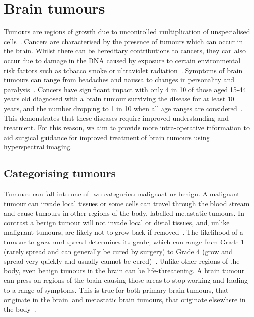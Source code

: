 \section{Brain tumours}\label{sec:braintumours}
Tumours are regions of growth due to uncontrolled multiplication of unspecialised cells~\citep{WorldHealthOrganisation2023}. Cancers are characterised by the presence of tumours which can occur in the brain. Whilst there can be hereditary contributions to cancers, they can also occur due to damage in the DNA caused by exposure to certain environmental risk factors such as tobacco smoke or ultraviolet radiation~\citep{WorldHealthOrganisation2023}. 
Symptoms of brain tumours can range from headaches and nausea to changes in personality and paralysis~\citep{NationalHealthService2023}. 
Cancers have significant impact with only 4 in 10 of those aged 15-44 years old diagnosed with a brain tumour surviving the disease for at least 10 years, and the number dropping to 1 in 10 when all age ranges are considered~\citep{CancerResearchUK2023}. This demonstrates that these diseases require improved understanding and treatment. For this reason, we aim to provide more intra-operative information to aid surgical guidance for improved treatment of brain tumours using hyperspectral imaging. 

\subsection{Categorising tumours} 
Tumours can fall into one of two categories: malignant or benign. A malignant tumour can invade local tissues or some cells can travel through the blood stream and cause tumours in other regions of the body, labelled metastatic tumours. In contrast a benign tumour will not invade local or distal tissues, and, unlike malignant tumours, are likely not to grow back if removed~\citep{Institute2021}. The likelihood of a tumour to grow and spread determines its grade, which can range from Grade 1 (rarely spread and can generally be cured by surgery) to Grade 4 (grow and spread very quickly and usually cannot be cured)~\citep{Institute2023}. Unlike other regions of the body, even benign tumours in the brain can be life-threatening. A brain tumour can press on regions of the brain causing those areas to stop working and leading to a range of symptoms. This is true for both primary brain tumours, that originate in the brain, and metastatic brain tumours, that originate elsewhere in the body~\citep{Institute2021}.

